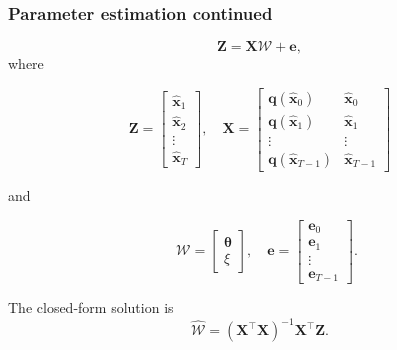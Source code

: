 \documentclass[compress]{beamer}
\begin{document}
\begin{frame}\frametitle{Parameter estimation continued}
\begin{equation}
	\mathbf Z=\mathbf X \mathcal W+\mathbf{e}, 
\end{equation}
\pause
where
\begin{small}
\begin{equation*}
	\mathbf Z=\left[
	\begin{array}{cccc}
		\hat{\mathbf x}_{1}\\
		\hat{\mathbf x}_{2}\\
		\vdots\\
		\hat{\mathbf x}_{T}
	\end{array}
	\right],\quad \mathbf X=\left[
	\begin{array}{cccc}
		\mathbf q(\hat{\mathbf x}_0)& \hat{\mathbf x}_{0}\\
		\mathbf q(\hat{\mathbf x}_1)& \hat{\mathbf x}_{1}\\
		\vdots & \vdots\\
		\mathbf q(\hat{\mathbf x}_{T-1})& \hat{\mathbf x}_{T-1}
	\end{array}
	\right] 
\end{equation*}
\end{small}
and
\begin{small}
\begin{equation*}
\quad \mathcal W=\left[
	\begin{array}{cc}
		\boldsymbol{\theta} \\
		\xi
	\end{array}
	\right],\quad \mathbf{e}=\left[
	\begin{array}{cccc}
		\mathbf e_0\\
		\mathbf e_1\\
		\vdots\\
		\mathbf e_{T-1}
	\end{array}
	\right].
\end{equation*}
\end{small}
\pause
The closed-form solution is
\begin{equation}
	\hat{\mathcal{W}}=(\mathbf X^\top\mathbf X)^{-1}\mathbf X^\top\mathbf Z. 
\end{equation}
\end{frame}
\end{document}
